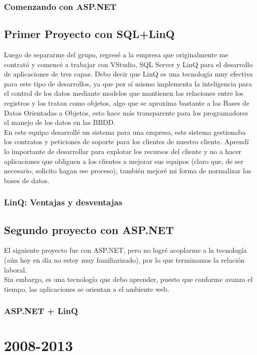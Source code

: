 \documentclass[12pt,spanish,lettersize]{book}
\begin{document}
\subsection{Comenzando con ASP.NET}
\section{Primer Proyecto con SQL+LinQ}
Luego de separarme del grupo, regresé a la empresa que originalmente me contrató y comencé a trabajar con VStudio, SQL Server y LinQ para el desarrollo de aplicaciones de tres capas. Debo decir que LinQ es una tecnología muy efectiva para este tipo de desarrollos, ya que por sí mismo implementa la inteligencia para el control de los datos mediante modelos que mantienen las relaciones entre los registros y los tratan como objetos, algo que se aproxima bastante a las Bases de Datos Orientadas a Objetos,  esto hace más transparente para los programadores el manejo de los datos en las BBDD.\\

En este equipo desarrollé un sistema para una empresa, este sistema gestionaba los contratos y peticiones de soporte para los clientes de nuestro cliente. Aprendí lo importante de desarrollar para explotar los recursos del cliente y no a hacer aplicaciones que obliguen a los clientes a mejorar sus equipos (claro que, de ser necesario, solicito hagan ese proceso), también mejoré mi forma de normalizar las bases de datos.\\
\subsection{LinQ: Ventajas y desventajas}
\section{Segundo proyecto con ASP.NET}

El siguiente proyecto fue con ASP.NET, pero no logré acoplarme a la tecnología (aún hoy en día no estoy muy familiarizado), por lo que terminamos la relación laboral.\\

Sin embargo, es una tecnología que debo aprender, puesto que conforme avanza el tiempo, las aplicaciones se orientan a el ambiente web.\\
\subsection{ASP.NET + LinQ}
\chapter{2008-2013}
\end{document}
